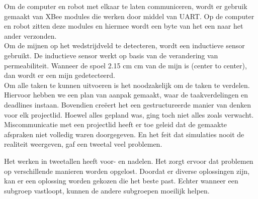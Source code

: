 \documentclass{report}
\begin{document}
Om de computer en robot met elkaar te laten communiceren, wordt er gebruik gemaakt van XBee modules die werken door middel van UART. Op de computer en robot zitten deze modules en hiermee wordt een byte van het een naar het ander verzonden.
\\

Om de mijnen op het wedstrijdveld te detecteren, wordt een inductieve sensor gebruikt. De inductieve sensor werkt op basis van de verandering van permeabiliteit. Wanneer de spoel 2.15 cm  cm van de mijn is (center to center), dan wordt er een mijn gedetecteerd.\\

Om alle taken te kunnen uitvoeren is het noodzakelijk om de taken te verdelen. Hiervoor hebben we een plan van aanpak gemaakt, waar de taakverdelingen en deadlines instaan. Bovendien cre\"eert het een gestructureerde manier van denken voor elk projectlid.
Hoewel alles gepland was, ging toch niet alles zoals verwacht. Miscommunicatie met een projectlid heeft er toe geleid dat de gemaakte afspraken niet volledig waren doorgegeven. En het feit dat simulaties nooit de realiteit weergeven, gaf een tweetal veel problemen.

Het werken in tweetallen heeft voor- en nadelen. Het zorgt ervoor dat problemen op verschillende manieren worden opgelost. Doordat er diverse oplossingen zijn, kan er een oplossing worden gekozen die het beste past. Echter wanneer een subgroep vastloopt, kunnen de andere subgroepen moeilijk helpen.  
\end{document}
